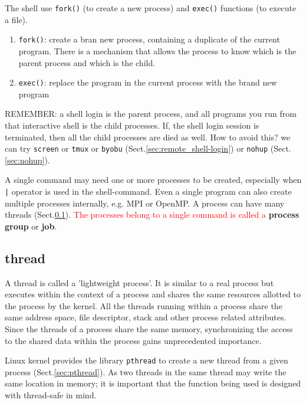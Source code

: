 The shell use \verb!fork()! (to create a new process) and \verb!exec()!
functions (to execute a file). 

\begin{enumerate}
  \item \verb!fork()!: create a bran new process, containing a
  duplicate of the current program. There is a mechanism that allows the process to know which is
  the parent process and which is the child.

  \item \verb!exec()!: replace the program in the current process with the brand
  new program
\end{enumerate}

REMEMBER: a shell login is the parent process, and all programs you
run from that interactive shell is the child processes. If, the shell login session is
terminated, then all the child processes are died as well. How to avoid this?
we can try \verb!screen! or \verb!tmux! or \verb!byobu!
(Sect.\ref{sec:remote_shell-login}) or \verb!nohup! (Sect.\ref{sec:nohup}).


A single command may need one or more processes to be created, especially when
\verb!|! operator is used in the shell-command. Even a single program can also
create multiple processes internally, e.g. MPI or OpenMP. A process can have
many threads (Sect.\ref{sec:thread}).
\textcolor{red}{The processes belong to a single command is called a } {\bf
process group} or {\bf job}.


\subsection{thread}
\label{sec:thread}

A thread is called a 'lightweight process'. It is similar to a real process but
executes within the context of a process and shares the same resources allotted
to the process by the kernel. All the threads running within a process share the
same address space, file descriptor, stack and other process related attributes. 
Since the threads of a process share the same memory, synchronizing the access
to the shared data within the process gains unprecedented importance.

Linux kernel provides the library \verb!pthread! to create a new thread from a
given process (Sect.\ref{sec:pthread}). As two threads in the same thread may
write the same location in memory; it is important that the function being used
is designed with thread-safe in mind.


